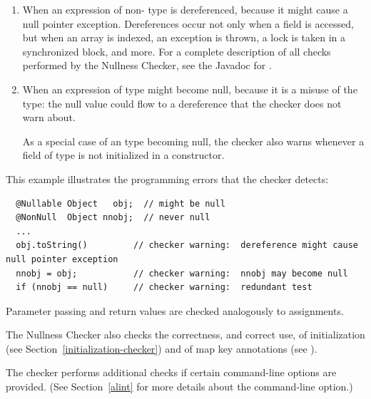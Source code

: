 \begin{enumerate}

\item
  When an expression of non- type
  is dereferenced, because it might cause a null pointer exception.
  Dereferences occur not only when a field is accessed, but when an array
  is indexed, an exception is thrown, a lock is taken in a synchronized
  block, and more.  For a complete description of all checks performed by
  the Nullness Checker, see the Javadoc for
  .

\item
  When an expression of  type
  might become null, because it
  is a misuse of the type:  the null value could flow to a dereference that
  the checker does not warn about.

  As a special case of an 
  type becoming null, the checker also warns whenever a field of
   type is not initialized in a
  constructor.

\end{enumerate}

This example illustrates the programming errors that the checker detects:

\begin{Verbatim}
  @Nullable Object   obj;  // might be null
  @NonNull  Object nnobj;  // never null
  ...
  obj.toString()         // checker warning:  dereference might cause null pointer exception
  nnobj = obj;           // checker warning:  nnobj may become null
  if (nnobj == null)     // checker warning:  redundant test
\end{Verbatim}

Parameter passing and return values are checked analogously to assignments.

The Nullness Checker also checks the correctness, and correct use, of
initialization (see
Section~\ref{initialization-checker}) and of map key annotations (see
).


The checker performs additional checks if certain 
command-line options are provided.  (See
Section~\ref{alint} for more details about the 
command-line option.)




